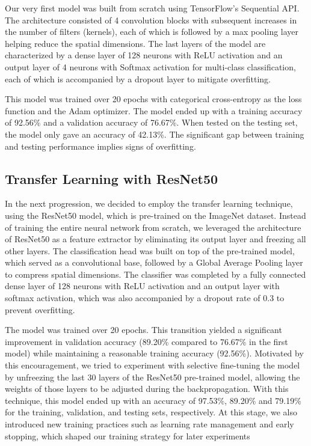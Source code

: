\documentclass[conference]{IEEEtran}
\begin{document}
Our very first model was built from scratch using TensorFlow’s Sequential API. The architecture consisted of 4 convolution blocks with subsequent increases in the number of filters (kernels), 
each of which is followed by a max pooling layer helping reduce the spatial dimensions. The last layers of the model are characterized by a dense layer of 128 neurons with ReLU activation and an output layer of 4 neurons with Softmax activation for multi-class classification, each of which is accompanied by a dropout layer to mitigate overfitting. 

This model was trained over 20 epochs with categorical cross-entropy as the loss function and the Adam optimizer. 
The model ended up with a training accuracy of 92.56\% and a validation accuracy of 76.67\%. When tested on the testing set, the model only gave an accuracy of 42.13\%. The significant gap between training and testing performance implies signs of overfitting.

\subsection{\large Transfer Learning with ResNet50}

In the next progression, we decided to employ the transfer learning technique, using the ResNet50 model, which is pre-trained on the ImageNet dataset. Instead of training the entire neural network from scratch, we leveraged the architecture of ResNet50 as a feature extractor by eliminating its output layer and freezing all other layers. The classification head was built on top of the pre-trained model, which served as a convolutional base, followed by a Global Average Pooling layer to compress spatial dimensions. The classifier was completed by a fully connected dense layer of 128 neurons with ReLU activation and an output layer with softmax activation, which was also accompanied by a dropout rate of 0.3 to prevent overfitting. \

The model was trained over 20 epochs. This transition yielded a significant improvement in validation accuracy (89.20\% compared to 76.67\% in the first model) while maintaining a reasonable training accuracy (92.56\%). Motivated by this encouragement, we tried to experiment with selective fine-tuning the model by unfreezing the last 30 layers of the ResNet50 pre-trained model, allowing the weights of those layers to be adjusted during the backpropagation. With this technique, this model ended up with an accuracy of 97.53\%, 89.20\% and 79.19\% for the training, validation, and testing sets, respectively. At this stage, we also introduced new training practices such as learning rate management and early stopping, which shaped our training strategy for later experiments
\end{document}

